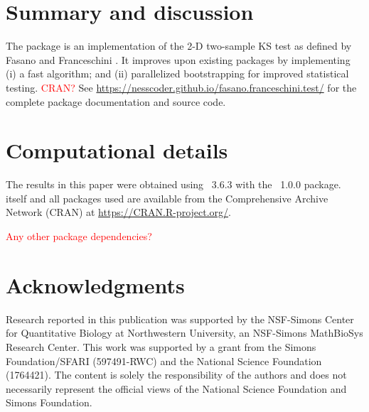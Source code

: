 \documentclass[codesnippet]{jss}
\newcommand{\RBnote}[1]{\textcolor{red}{#1}}
\begin{document}

\section{Summary and discussion} \label{sec:summary}

The  package is an  implementation of the 2-D two-sample KS test as defined by Fasano and Franceschini \citep{Fasano1987}.
It improves upon existing packages by implementing 
  (i) a fast algorithm; and 
  (ii) parallelized bootstrapping for improved statistical testing.
\RBnote{CRAN?}
  See \url{https://nesscoder.github.io/fasano.franceschini.test/} for the complete package documentation and source code.



\section*{Computational details}


The results in this paper were obtained using
~3.6.3 with the
~1.0.0 package.  itself
and all packages used are available from the Comprehensive
 Archive Network (CRAN) at
\url{https://CRAN.R-project.org/}.

\RBnote{Any other package dependencies?}

\section*{Acknowledgments}

Research reported in this publication was supported by the NSF-Simons Center for Quantitative Biology at Northwestern University, an NSF-Simons MathBioSys Research Center. This work was supported by a grant from the Simons Foundation/SFARI (597491-RWC) and the National Science Foundation (1764421). The content is solely the responsibility of the authors and does not necessarily represent the official views of the National Science Foundation and Simons Foundation.
\end{document}
